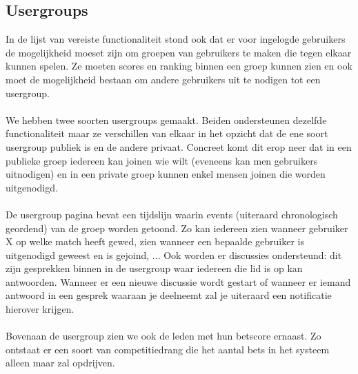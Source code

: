 \documentclass[11pt, a4paper]{article}
\begin{document}
\subsection{Usergroups}
In de lijst van vereiste functionaliteit stond ook dat er voor ingelogde gebruikers de mogelijkheid moeset zijn om groepen van gebruikers te maken die tegen elkaar kunnen spelen.
Ze moeten scores en ranking binnen een groep kunnen zien en ook moet de mogelijkheid bestaan om andere gebruikers uit te nodigen tot een usergroup.
\\
\\
We hebben twee soorten usergroups gemaakt. Beiden ondersteunen dezelfde functionaliteit maar ze verschillen van elkaar in het opzicht dat de ene soort usergroup publiek is en de andere privaat.
Concreet komt dit erop neer dat in een publieke groep iedereen kan joinen wie wilt (eveneens kan men gebruikers uitnodigen) en in een private groep kunnen enkel mensen joinen die worden uitgenodigd.
\\
\\
De usergroup pagina bevat een tijdslijn waarin events (uiteraard chronologisch geordend) van de groep worden getoond. Zo kan iedereen zien wanneer gebruiker X op welke match heeft gewed, zien wanneer een bepaalde gebruiker is uitgenodigd geweest en is gejoind, ...
Ook worden er discussies ondersteund: dit zijn gesprekken binnen in de usergroup waar iedereen die lid is op kan antwoorden. Wanneer er een nieuwe discussie wordt gestart of wanneer er iemand antwoord in een gesprek waaraan je deelneemt zal je uiteraard een notificatie hierover krijgen.
\\
\\
Bovenaan de usergroup zien we ook de leden met hun betscore ernaast. Zo ontstaat er een soort van competitiedrang die het aantal bets in het systeem alleen maar zal opdrijven.
\end{document}
